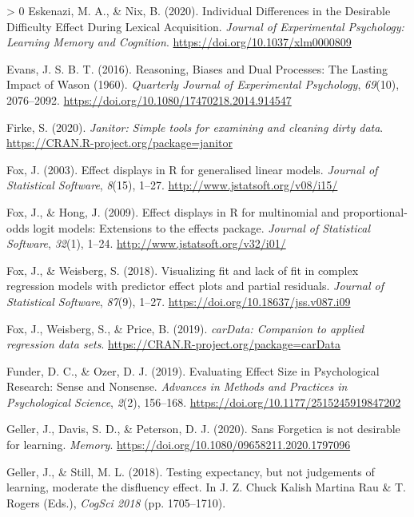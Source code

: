 \documentclass[
  english,
  jou]{apa7}
\newlength{\cslhangindent}
\newenvironment{CSLReferences}[3] %
 {%
  \setlength{\parindent}{0pt}
  \ifodd #1 \everypar{\setlength{\hangindent}{\cslhangindent}}\ignorespaces\fi
  \ifnum #2 > 0
  \setlength{\parskip}{#2\baselineskip}
  \fi
 }%
 {}
\begin{document}
\begin{CSLReferences}{1}{0}
\leavevmode\hypertarget{ref-Eskenazi2020}{}%
Eskenazi, M. A., \& Nix, B. (2020). {Individual Differences in the Desirable Difficulty Effect During Lexical Acquisition}. \emph{Journal of Experimental Psychology: Learning Memory and Cognition}. \url{https://doi.org/10.1037/xlm0000809}

\leavevmode\hypertarget{ref-Evans2016}{}%
Evans, J. S. B. T. (2016). {Reasoning, Biases and Dual Processes: The Lasting Impact of Wason (1960)}. \emph{Quarterly Journal of Experimental Psychology}, \emph{69}(10), 2076--2092. \url{https://doi.org/10.1080/17470218.2014.914547}

\leavevmode\hypertarget{ref-R-janitor}{}%
Firke, S. (2020). \emph{Janitor: Simple tools for examining and cleaning dirty data}. \url{https://CRAN.R-project.org/package=janitor}

\leavevmode\hypertarget{ref-R-effects_b}{}%
Fox, J. (2003). Effect displays in {R} for generalised linear models. \emph{Journal of Statistical Software}, \emph{8}(15), 1--27. \url{http://www.jstatsoft.org/v08/i15/}

\leavevmode\hypertarget{ref-R-effects_c}{}%
Fox, J., \& Hong, J. (2009). Effect displays in {R} for multinomial and proportional-odds logit models: Extensions to the {effects} package. \emph{Journal of Statistical Software}, \emph{32}(1), 1--24. \url{http://www.jstatsoft.org/v32/i01/}

\leavevmode\hypertarget{ref-R-effects_a}{}%
Fox, J., \& Weisberg, S. (2018). Visualizing fit and lack of fit in complex regression models with predictor effect plots and partial residuals. \emph{Journal of Statistical Software}, \emph{87}(9), 1--27. \url{https://doi.org/10.18637/jss.v087.i09}

\leavevmode\hypertarget{ref-R-carData}{}%
Fox, J., Weisberg, S., \& Price, B. (2019). \emph{carData: Companion to applied regression data sets}. \url{https://CRAN.R-project.org/package=carData}

\leavevmode\hypertarget{ref-Funder2019}{}%
Funder, D. C., \& Ozer, D. J. (2019). {Evaluating Effect Size in Psychological Research: Sense and Nonsense}. \emph{Advances in Methods and Practices in Psychological Science}, \emph{2}(2), 156--168. \url{https://doi.org/10.1177/2515245919847202}

\leavevmode\hypertarget{ref-Geller2020}{}%
Geller, J., Davis, S. D., \& Peterson, D. J. (2020). {Sans Forgetica is not desirable for learning}. \emph{Memory}. \url{https://doi.org/10.1080/09658211.2020.1797096}

\leavevmode\hypertarget{ref-cogsci18-Geller}{}%
Geller, J., \& Still, M. L. (2018). Testing expectancy, but not judgements of learning, moderate the disfluency effect. In J. Z. Chuck Kalish Martina Rau \& T. Rogers (Eds.), \emph{CogSci 2018} (pp. 1705--1710).


\end{CSLReferences}
\end{document}
